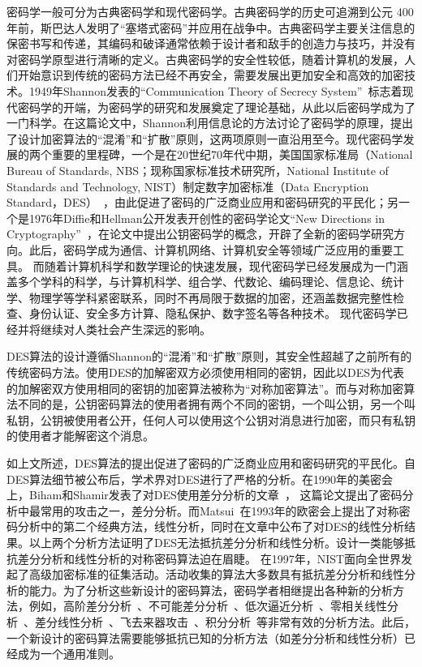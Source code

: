 \documentclass[a4paper,zihao=-4,AutoFakeBold]{ctexart}
\begin{document}
密码学一般可分为古典密码学和现代密码学。古典密码学的历史可追溯到公元 400 年前，斯巴达人发明了``塞塔式密码''并应用在战争中。古典密码学主要关注信息的保密书写和传递，其编码和破译通常依赖于设计者和敌手的创造力与技巧，并没有对密码学原型进行清晰的定义。古典密码学的安全性较低，随着计算机的发展，人们开始意识到传统的密码方法已经不再安全，需要发展出更加安全和高效的加密技术。1949年Shannon发表的``Communication Theory of Secrecy System''~\cite{Shannon49}标志着现代密码学的开端，为密码学的研究和发展奠定了理论基础，从此以后密码学成为了一门科学。在这篇论文中，Shannon利用信息论的方法讨论了密码学的原理，提出了设计加密算法的``混淆''和``扩散''原则，这两项原则一直沿用至今。现代密码学发展的两个重要的里程碑，一个是在20世纪70年代中期，美国国家标准局（National Bureau of Standards, NBS；现称国家标准技术研究所，National Institute of Standards and Technology, NIST）制定数字加密标准（Data Encryption Standard，DES）~\cite{DES}，由此促进了密码的广泛商业应用和密码研究的平民化；另一个是1976年Diffie和Hellman公开发表开创性的密码学论文``New Directions in Cryptography''~\cite{DiffieHellman}，在论文中提出公钥密码学的概念，开辟了全新的密码学研究方向。此后，密码学成为通信、计算机网络、计算机安全等领域广泛应用的重要工具。
而随着计算机科学和数学理论的快速发展，现代密码学已经发展成为一门涵盖多个学科的科学，与计算机科学、组合学、代数论、编码理论、信息论、统计学、物理学等学科紧密联系，同时不再局限于数据的加密，还涵盖数据完整性检查、身份认证、安全多方计算、隐私保护、数字签名等各种技术。
现代密码学已经并将继续对人类社会产生深远的影响。

DES算法的设计遵循Shannon的``混淆''和``扩散''原则，其安全性超越了之前所有的传统密码方法。使用DES的加解密双方必须使用相同的密钥，因此以DES为代表的加解密双方使用相同的密钥的加密算法被称为``对称加密算法''。而与对称加密算法不同的是，公钥密码算法的使用者拥有两个不同的密钥，一个叫公钥，另一个叫私钥，公钥被使用者公开，任何人可以使用这个公钥对消息进行加密，而只有私钥的使用者才能解密这个消息。


如上文所述，DES算法的提出促进了密码的广泛商业应用和密码研究的平民化。自DES算法细节被公布后，学术界对DES进行了严格的分析。在1990年的美密会上，Biham和Shamir发表了对DES使用差分分析的文章~\cite{BihamSCRYPTO90}， 这篇论文提出了密码分析中最常用的攻击之一，差分分析。而Matsui~\cite{M94}在1993年的欧密会上提出了对称密码分析中的第二个经典方法，线性分析，同时在文章中公布了对DES的线性分析结果。以上两个分析方法证明了DES无法抵抗差分分析和线性分析。设计一类能够抵抗差分分析和线性分析的对称密码算法迫在眉睫。
在1997年，NIST面向全世界发起了高级加密标准的征集活动。活动收集的算法大多数具有抵抗差分分析和线性分析的能力。为了分析这些新设计的密码算法，密码学者相继提出各种新的分析方法，例如，高阶差分分析~\cite{LRK95}、不可能差分分析~\cite{BihamBS99}、低次逼近分析~\cite{GJloworderapproximation,KR96}、零相关线性分析~\cite{SunLGRL16}、差分线性分析~\cite{DLCTLi2019}、飞去来器攻击~\cite{BoomerangAttack99}、积分分析~\cite{IntegralCryptanalysis02}等非常有效的分析方法。此后，一个新设计的密码算法需要能够抵抗已知的分析方法（如差分分析和线性分析）已经成为一个通用准则。
\end{document}
